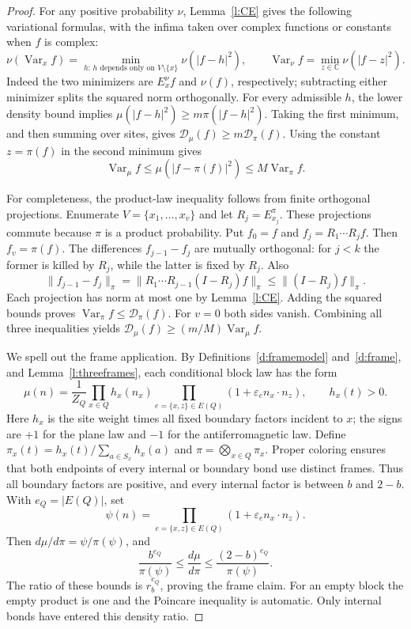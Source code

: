 \begin{proof}
For any positive probability \(\nu\), Lemma~\ref{l:CE} gives the
following variational formulas, with the infima taken over complex
functions or constants when \(f\) is complex:
\[
 \nu(\operatorname{Var}_x f)
   =\min_{h:\,h\text{ depends only on }V\setminus\{x\}}
                      \nu(|f-h|^2),\qquad
 \operatorname{Var}_\nu f=\min_{z\in\mathbb C}\nu(|f-z|^2).
\]
Indeed the two minimizers are \(E_x^\nu f\) and \(\nu(f)\),
respectively; subtracting either minimizer splits the squared norm
orthogonally.  For every admissible \(h\), the lower density bound
implies \(\mu(|f-h|^2)\ge m\pi(|f-h|^2)\).
Taking the first minimum, and then summing over sites, gives
\(\mathcal D_\mu(f)\ge m\mathcal D_\pi(f)\).
Using the constant \(z=\pi(f)\) in the second minimum gives
\[
 \operatorname{Var}_\mu f\le\mu(|f-\pi(f)|^2)
                         \le M\operatorname{Var}_\pi f.
\]

For completeness, the product-law inequality follows from finite
orthogonal projections.  Enumerate \(V=\{x_1,\ldots,x_v\}\) and let
\(R_j=E_{x_j}^\pi\).  These projections commute because \(\pi\) is
a product probability.  Put \(f_0=f\) and
\(f_j=R_1\cdots R_jf\).  Then \(f_v=\pi(f)\).
The differences \(f_{j-1}-f_j\) are mutually orthogonal: for \(j<k\)
the former is killed by \(R_j\), while the latter is fixed by
\(R_j\).  Also
\[
 \|f_{j-1}-f_j\|_\pi
   =\|R_1\cdots R_{j-1}(I-R_j)f\|_\pi
   \le\|(I-R_j)f\|_\pi.
\]
Each projection has norm at most one by Lemma~\ref{l:CE}.
Adding the squared bounds proves
\(\operatorname{Var}_\pi f\le\mathcal D_\pi(f)\).
For \(v=0\) both sides vanish.  Combining all three inequalities
yields
\(\mathcal D_\mu(f)\ge(m/M)\operatorname{Var}_\mu f\).

We spell out the frame application.  By
Definitions~\ref{d:framemodel} and~\ref{d:frame}, and
Lemma~\ref{l:threeframes}, each conditional block law has the form
\[
 \mu(n)=\frac1{Z_Q}
       \prod_{x\in Q}h_x(n_x)
       \prod_{e=\{x,z\}\in E(Q)}(1+\varepsilon_e n_x\cdot n_z),
 \qquad h_x(t)>0.
\]
Here \(h_x\) is the site weight times all fixed boundary factors
incident to \(x\); the signs are \(+1\) for the plane law and
\(-1\) for the antiferromagnetic law.  Define
\(\pi_x(t)=h_x(t)/\sum_{a\in S_x}h_x(a)\) and
\(\pi=\bigotimes_{x\in Q}\pi_x\).
Proper coloring ensures that both endpoints of every internal or
boundary bond use distinct frames.  Thus all boundary factors are
positive, and every internal factor is between \(b\) and \(2-b\).
With \(e_Q=|E(Q)|\), set
\[
 \psi(n)=\prod_{e=\{x,z\}\in E(Q)}
                     (1+\varepsilon_e n_x\cdot n_z).
\]
Then \(d\mu/d\pi=\psi/\pi(\psi)\), and
\[
 \frac{b^{e_Q}}{\pi(\psi)}
      \le\frac{d\mu}{d\pi}
      \le\frac{(2-b)^{e_Q}}{\pi(\psi)}.
\]
The ratio of these bounds is \(r_b^{e_Q}\), proving the frame claim.
For an empty block the empty product is one and the Poincare inequality
is automatic.  Only internal bonds have entered this density ratio.
\end{proof}


